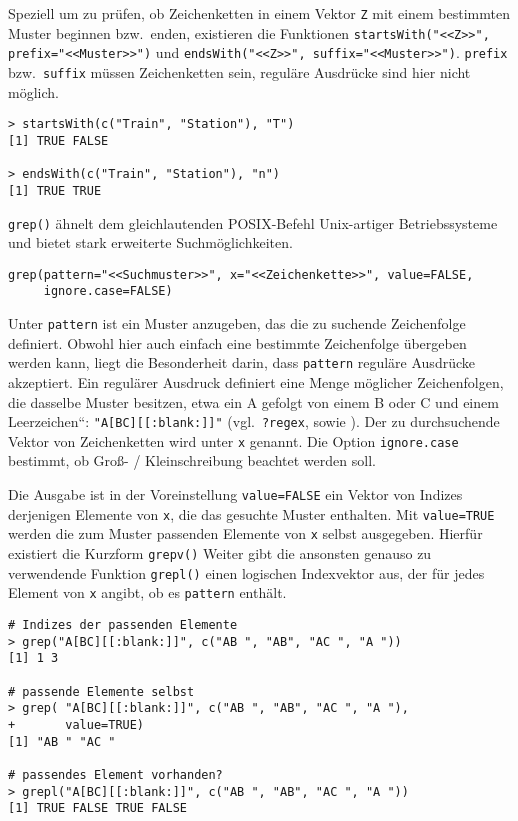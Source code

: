 Speziell um zu prüfen, ob Zeichenketten in einem Vektor \lstinline!Z! mit einem bestimmten Muster beginnen bzw.\ enden, existieren die Funktionen \lstinline!startsWith("<<Z>>", prefix="<<Muster>>")! und \lstinline!endsWith("<<Z>>", suffix="<<Muster>>")!. \lstinline!prefix! bzw.\ \lstinline!suffix! müssen Zeichenketten sein, reguläre Ausdrücke sind hier nicht möglich.
\begin{lstlisting}
> startsWith(c("Train", "Station"), "T")
[1] TRUE FALSE

> endsWith(c("Train", "Station"), "n")
[1] TRUE TRUE
\end{lstlisting}

\lstinline!grep()! ähnelt dem gleichlautenden POSIX-Befehl Unix-artiger Betriebssysteme und bietet stark erweiterte Suchmöglichkeiten.
\begin{lstlisting}
grep(pattern="<<Suchmuster>>", x="<<Zeichenkette>>", value=FALSE,
     ignore.case=FALSE)
\end{lstlisting}

Unter \lstinline!pattern! ist ein Muster anzugeben, das die zu suchende Zeichenfolge definiert. Obwohl hier auch einfach eine bestimmte Zeichenfolge übergeben werden kann, liegt die Besonderheit darin, dass \lstinline!pattern! reguläre Ausdrücke akzeptiert. Ein regulärer Ausdruck definiert eine Menge möglicher Zeichenfolgen, die dasselbe Muster besitzen, etwa {\quotedblbase}ein A gefolgt von einem B oder C und einem Leerzeichen{\textquotedblleft}: \lstinline!"A[BC][[:blank:]]"! (vgl.\ \lstinline!?regex!, sowie ). Der zu durchsuchende Vektor von Zeichenketten wird unter \lstinline!x! genannt. Die Option \lstinline!ignore.case! bestimmt, ob Groß- / Kleinschreibung beachtet werden soll.

Die Ausgabe ist in der Voreinstellung \lstinline!value=FALSE! ein Vektor von Indizes derjenigen Elemente von \lstinline!x!, die das gesuchte Muster enthalten. Mit \lstinline!value=TRUE! werden die zum Muster passenden Elemente von \lstinline!x! selbst ausgegeben. Hierfür existiert die Kurzform \lstinline!grepv()! Weiter gibt die ansonsten genauso zu verwendende Funktion \lstinline!grepl()! einen logischen Indexvektor aus, der für jedes Element von \lstinline!x! angibt, ob es \lstinline!pattern! enthält.
\begin{lstlisting}
# Indizes der passenden Elemente
> grep("A[BC][[:blank:]]", c("AB ", "AB", "AC ", "A "))
[1] 1 3

# passende Elemente selbst
> grep( "A[BC][[:blank:]]", c("AB ", "AB", "AC ", "A "),
+       value=TRUE)
[1] "AB " "AC "

# passendes Element vorhanden?
> grepl("A[BC][[:blank:]]", c("AB ", "AB", "AC ", "A "))
[1] TRUE FALSE TRUE FALSE
\end{lstlisting}

